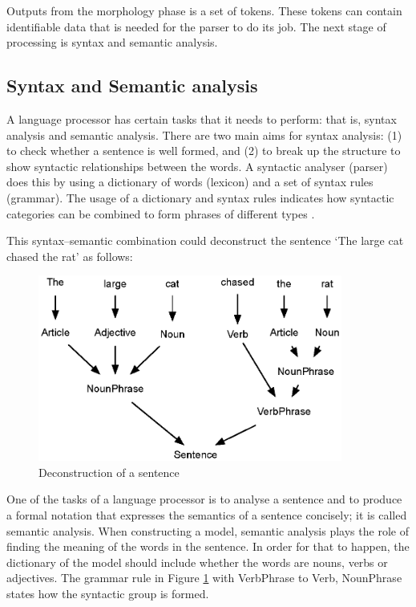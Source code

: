 Outputs from the morphology phase is a set of tokens. These tokens can contain identifiable data that is needed for the parser to do its job. The next stage of processing is syntax and semantic analysis.

\subsection{Syntax and Semantic analysis}

A language processor has certain tasks that it needs to perform: that is, syntax analysis and semantic analysis. There are two main aims for syntax analysis: (1) to check whether a sentence is well formed, and (2) to break up the structure to show syntactic relationships between the words. A syntactic analyser (parser) does this by using a dictionary of words (lexicon) and a set of syntax rules (grammar). The usage of a dictionary and syntax rules indicates how syntactic categories can be combined to form phrases of different types \cite{nation2007dissecting,feldman1999nlp}.

This syntax–semantic combination could deconstruct the sentence ‘The large cat chased the rat’ as follows:

\begin{figure}[htbp]
\centering
\includegraphics[width=10cm]{./figures/sen.eps}
\caption{Deconstruction of a sentence}
\label{fig:sentence}
\end{figure}

One of the tasks of a language processor is to analyse a sentence and to produce a formal notation that expresses the semantics of a sentence concisely; it is called semantic analysis.
When constructing a model, semantic analysis plays the role of finding the meaning of the words in the sentence. In order for that to happen, the dictionary of the model should include whether the words are nouns, verbs
or adjectives. The grammar rule in Figure \ref{fig:sentence} with VerbPhrase to Verb, NounPhrase states how the syntactic group is formed.

